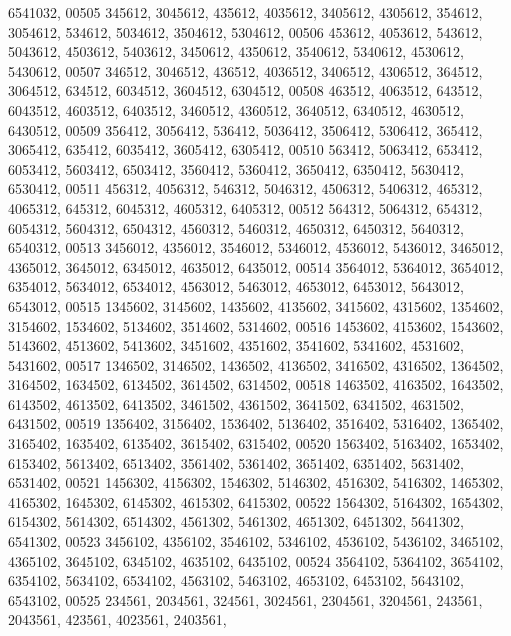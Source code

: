 \begin{DoxyCode}
      6541032,
00505        345612, 3045612,  435612, 4035612, 3405612, 4305612,  354612, 3054612,  534612, 5034612, 3504612, 
      5304612,
00506        453612, 4053612,  543612, 5043612, 4503612, 5403612, 3450612, 4350612, 3540612, 5340612, 4530612, 
      5430612,
00507        346512, 3046512,  436512, 4036512, 3406512, 4306512,  364512, 3064512,  634512, 6034512, 3604512, 
      6304512,
00508        463512, 4063512,  643512, 6043512, 4603512, 6403512, 3460512, 4360512, 3640512, 6340512, 4630512, 
      6430512,
00509        356412, 3056412,  536412, 5036412, 3506412, 5306412,  365412, 3065412,  635412, 6035412, 3605412, 
      6305412,
00510        563412, 5063412,  653412, 6053412, 5603412, 6503412, 3560412, 5360412, 3650412, 6350412, 5630412, 
      6530412,
00511        456312, 4056312,  546312, 5046312, 4506312, 5406312,  465312, 4065312,  645312, 6045312, 4605312, 
      6405312,
00512        564312, 5064312,  654312, 6054312, 5604312, 6504312, 4560312, 5460312, 4650312, 6450312, 5640312, 
      6540312,
00513       3456012, 4356012, 3546012, 5346012, 4536012, 5436012, 3465012, 4365012, 3645012, 6345012, 4635012, 
      6435012,
00514       3564012, 5364012, 3654012, 6354012, 5634012, 6534012, 4563012, 5463012, 4653012, 6453012, 5643012, 
      6543012,
00515       1345602, 3145602, 1435602, 4135602, 3415602, 4315602, 1354602, 3154602, 1534602, 5134602, 3514602, 
      5314602,
00516       1453602, 4153602, 1543602, 5143602, 4513602, 5413602, 3451602, 4351602, 3541602, 5341602, 4531602, 
      5431602,
00517       1346502, 3146502, 1436502, 4136502, 3416502, 4316502, 1364502, 3164502, 1634502, 6134502, 3614502, 
      6314502,
00518       1463502, 4163502, 1643502, 6143502, 4613502, 6413502, 3461502, 4361502, 3641502, 6341502, 4631502, 
      6431502,
00519       1356402, 3156402, 1536402, 5136402, 3516402, 5316402, 1365402, 3165402, 1635402, 6135402, 3615402, 
      6315402,
00520       1563402, 5163402, 1653402, 6153402, 5613402, 6513402, 3561402, 5361402, 3651402, 6351402, 5631402, 
      6531402,
00521       1456302, 4156302, 1546302, 5146302, 4516302, 5416302, 1465302, 4165302, 1645302, 6145302, 4615302, 
      6415302,
00522       1564302, 5164302, 1654302, 6154302, 5614302, 6514302, 4561302, 5461302, 4651302, 6451302, 5641302, 
      6541302,
00523       3456102, 4356102, 3546102, 5346102, 4536102, 5436102, 3465102, 4365102, 3645102, 6345102, 4635102, 
      6435102,
00524       3564102, 5364102, 3654102, 6354102, 5634102, 6534102, 4563102, 5463102, 4653102, 6453102, 5643102, 
      6543102,
00525        234561, 2034561,  324561, 3024561, 2304561, 3204561,  243561, 2043561,  423561, 4023561, 2403561, 

\end{DoxyCode}
